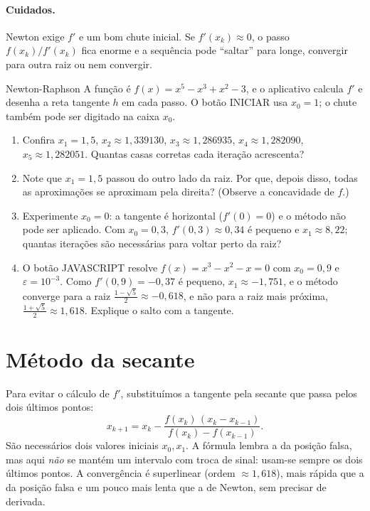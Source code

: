 \paragraph{Cuidados.} Newton exige $f'$ e um bom chute inicial. Se $f'(x_k)\approx0$, o passo
$f(x_k)/f'(x_k)$ fica enorme e a sequência pode ``saltar'' para longe, convergir para outra raiz
ou nem convergir.

\begin{atividade}{Newton-Raphson}{\arqNewton}
A função é $f(x)=x^5-x^3+x^2-3$, e o aplicativo calcula $f'$ e desenha a reta tangente $h$ em
cada passo. O botão INICIAR usa $x_0=1$; o chute também pode ser digitado na caixa $x_0$.
\begin{enumerate}[nosep]
  \item Confira $x_1=1{,}5$, $x_2\approx1{,}339130$, $x_3\approx1{,}286935$, $x_4\approx1{,}282090$,
        $x_5\approx1{,}282051$. Quantas casas corretas cada iteração acrescenta?
  \item Note que $x_1=1{,}5$ passou do outro lado da raiz. Por que, depois disso, todas as
        aproximações se aproximam pela direita? (Observe a concavidade de $f$.)
  \item Experimente $x_0=0$: a tangente é horizontal ($f'(0)=0$) e o método não pode ser aplicado.
        Com $x_0=0{,}3$, $f'(0{,}3)\approx0{,}34$ é pequeno e $x_1\approx8{,}22$; quantas iterações são
        necessárias para voltar perto da raiz?
  \item O botão JAVASCRIPT resolve $f(x)=x^3-x^2-x=0$ com $x_0=0{,}9$ e $\varepsilon=10^{-3}$.
        Como $f'(0{,}9)=-0{,}37$ é pequeno, $x_1\approx-1{,}751$, e o método converge para a raiz
        $\frac{1-\sqrt5}{2}\approx-0{,}618$, e não para a raiz mais próxima,
        $\frac{1+\sqrt5}{2}\approx1{,}618$. Explique o salto com a tangente.
\end{enumerate}
\end{atividade}

\section{Método da secante}

Para evitar o cálculo de $f'$, substituímos a tangente pela secante que passa pelos dois últimos
pontos:
\[
x_{k+1}=x_k-\frac{f(x_k)\,(x_k-x_{k-1})}{f(x_k)-f(x_{k-1})}.
\]
São necessários dois valores iniciais $x_0,x_1$. A fórmula lembra a da posição falsa, mas aqui
\emph{não} se mantém um intervalo com troca de sinal: usam-se sempre os dois últimos pontos. A
convergência é superlinear (ordem $\approx1{,}618$), mais rápida que a da posição falsa e um pouco
mais lenta que a de Newton, sem precisar de derivada.

